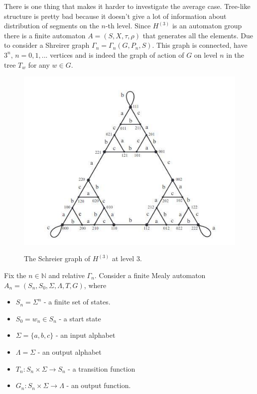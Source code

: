 \documentclass[a4paper,12pt]{amsart}
\begin{document}
There is one thing that makes it harder to investigate the average case. Tree-like structure is pretty bad
because it doesn't give a lot of information about distribution of segments on the $n$-th level. Since $H^{(3)}$ is an automaton group there is a finite automaton $A = (S, X, \tau, \rho)$ that generates all the elements. Due to \cite{Hanoi1}
consider a Shreirer graph $\Gamma_n = \Gamma_n(G, P_n, S)$. This graph is connected, have $3^n, \, n = 0, 1, ...$
vertices and is indeed the graph of action of $G$ on level $n$ in the tree $T_w$ for any $w \in G$.

\begin{figure}[h]
	\centering
	\includegraphics[scale=0.8]{../graphs/SchraierH3.jpg}
	\label{automaton}
	\caption{The Schreier graph of $H^{(3)}$ at level 3.}

\end{figure}

Fix the $n \in \mathbb{N}$ and relative $\Gamma_n$. Consider a finite Mealy automaton
$A_n = (S_n, S_0, \Sigma, \Lambda, T, G)$, where

\begin{itemize}
	\item $S_n = \Sigma^n$ - a finite set of states.
	\item $S_0 = w_n \in S_n$ - a start state
	\item $\Sigma = \{a, b, c\}$ - an input alphabet
	\item $\Lambda = \Sigma$ - an output alphabet
	\item $T_n: S_n \times \Sigma \rightarrow S_n$ - a transition function
	\item $G_n: S_n \times \Sigma \rightarrow \Lambda$ - an output function.
\end{itemize}
\end{document}

